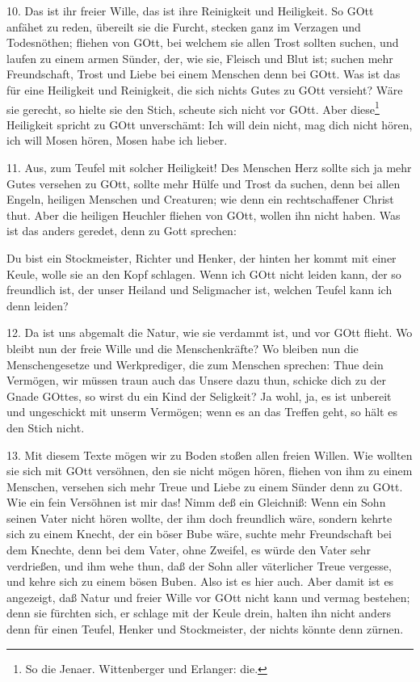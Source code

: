10. Das ist ihr freier Wille, das ist ihre Reinigkeit und Heiligkeit. So GOtt anfähet zu reden, übereilt sie die Furcht, stecken ganz im Verzagen und Todesnöthen; fliehen von GOtt, bei welchem sie allen Trost sollten suchen, und laufen zu einem armen Sünder, der, wie sie, Fleisch und Blut ist; suchen mehr Freundschaft, Trost und Liebe bei einem Menschen denn bei GOtt. Was ist das für eine Heiligkeit und Reinigkeit, die sich nichts Gutes zu GOtt versieht? Wäre sie gerecht, so hielte sie den Stich, scheute sich nicht vor GOtt. Aber diese\footnote{So die Jenaer. Wittenberger und Erlanger: die.} Heiligkeit spricht zu GOtt unverschämt: Ich will dein nicht, mag dich nicht hören, ich will Mosen hören, Mosen habe ich lieber.

11. Aus, zum Teufel mit solcher Heiligkeit! Des Menschen Herz sollte sich ja mehr Gutes versehen zu GOtt, sollte mehr Hülfe und Trost da suchen, denn bei allen Engeln, heiligen Menschen und Creaturen; wie denn ein rechtschaffener Christ thut. Aber die heiligen Heuchler fliehen von GOtt, wollen ihn nicht haben. Was ist das anders geredet, denn zu Gott sprechen:

Du bist ein Stockmeister, Richter und Henker, der hinten her kommt mit einer Keule, wolle sie an den Kopf schlagen. Wenn ich GOtt nicht leiden kann, der so freundlich ist, der unser Heiland und Seligmacher ist, welchen Teufel kann ich denn leiden?

12. Da ist uns abgemalt die Natur, wie sie verdammt ist, und vor GOtt flieht. Wo bleibt nun der freie Wille und die Menschenkräfte? Wo bleiben nun die Menschengesetze und Werkprediger, die zum Menschen sprechen: Thue dein Vermögen, wir müssen traun auch das Unsere dazu thun, schicke dich zu der Gnade GOttes, so wirst du ein Kind der Seligkeit? Ja wohl, ja, es ist unbereit und ungeschickt mit unserm Vermögen; wenn es an das Treffen geht, so hält es den Stich nicht.

13. Mit diesem Texte mögen wir zu Boden stoßen allen freien Willen. Wie wollten sie sich mit GOtt versöhnen, den sie nicht mögen hören, fliehen von ihm zu einem Menschen, versehen sich mehr Treue und Liebe zu einem Sünder denn zu GOtt. Wie ein fein Versöhnen ist mir das! Nimm deß ein Gleichniß: Wenn ein Sohn seinen Vater nicht hören wollte, der ihm doch freundlich wäre, sondern kehrte sich zu einem Knecht, der ein böser Bube wäre, suchte mehr Freundschaft bei dem Knechte, denn bei dem Vater, ohne Zweifel, es würde den Vater sehr verdrießen, und ihm wehe thun, daß der Sohn aller väterlicher Treue vergesse, und kehre sich zu einem bösen Buben. Also ist es hier auch. Aber damit ist es angezeigt, daß Natur und freier Wille vor GOtt nicht kann und vermag bestehen; denn sie fürchten sich, er schlage mit der Keule drein, halten ihn nicht anders denn für einen Teufel, Henker und Stockmeister, der nichts könnte denn zürnen.

